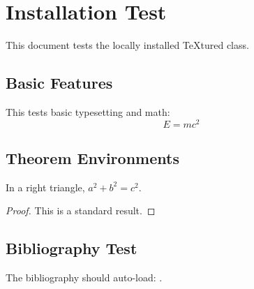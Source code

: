 \documentclass[12pt,a4paper]{textured}
\begin{document}
\chapter{Installation Test}

This document tests the locally installed TeXtured class.

\section{Basic Features}

This tests basic typesetting and math:
\begin{equation}
  E = mc^2
\end{equation}

\section{Theorem Environments}

\begin{theorem}
  In a right triangle, $a^2 + b^2 = c^2$.
\end{theorem}

\begin{proof}
  This is a standard result.
\end{proof}

\section{Bibliography Test}

The bibliography should auto-load: \autocite{TeXtured}.

\end{document}
